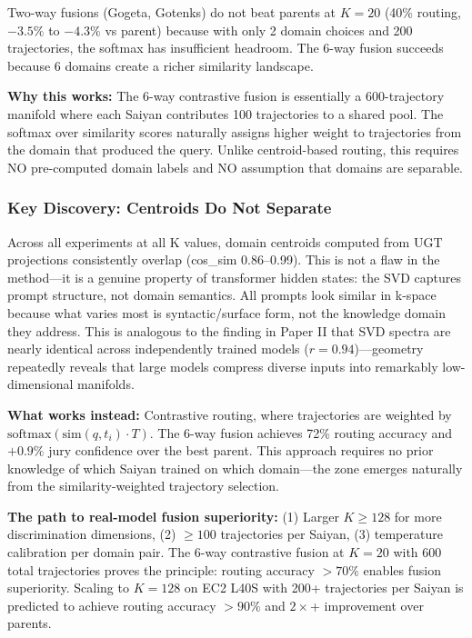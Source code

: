 \documentclass[11pt]{article}
\begin{document}
Two-way fusions (Gogeta, Gotenks) do not beat parents at $K=20$ (40\% routing, $-3.5\%$ to $-4.3\%$ vs parent) because with only 2 domain choices and 200 trajectories, the softmax has insufficient headroom. The 6-way fusion succeeds because 6 domains create a richer similarity landscape.

\textbf{Why this works:} The 6-way contrastive fusion is essentially a 600-trajectory manifold where each Saiyan contributes 100 trajectories to a shared pool. The softmax over similarity scores naturally assigns higher weight to trajectories from the domain that produced the query. Unlike centroid-based routing, this requires NO pre-computed domain labels and NO assumption that domains are separable.

\subsubsection*{Key Discovery: Centroids Do Not Separate}

Across all experiments at all K values, domain centroids computed from UGT projections consistently overlap (cos\_sim 0.86--0.99). This is not a flaw in the method---it is a genuine property of transformer hidden states: the SVD captures prompt structure, not domain semantics. All prompts look similar in k-space because what varies most is syntactic/surface form, not the knowledge domain they address. This is analogous to the finding in Paper II that SVD spectra are nearly identical across independently trained models ($r=0.94$)---geometry repeatedly reveals that large models compress diverse inputs into remarkably low-dimensional manifolds.

\textbf{What works instead:} Contrastive routing, where trajectories are weighted by $\text{softmax}(\text{sim}(q, t_i) \cdot T)$. The 6-way fusion achieves 72\% routing accuracy and $+0.9\%$ jury confidence over the best parent. This approach requires no prior knowledge of which Saiyan trained on which domain---the zone emerges naturally from the similarity-weighted trajectory selection.

\textbf{The path to real-model fusion superiority:} (1) Larger $K \ge 128$ for more discrimination dimensions, (2) $\ge 100$ trajectories per Saiyan, (3) temperature calibration per domain pair. The 6-way contrastive fusion at $K=20$ with 600 total trajectories proves the principle: routing accuracy $>70\%$ enables fusion superiority. Scaling to $K=128$ on EC2 L40S with 200+ trajectories per Saiyan is predicted to achieve routing accuracy $>90\%$ and $2\times$+ improvement over parents.
\end{document}

